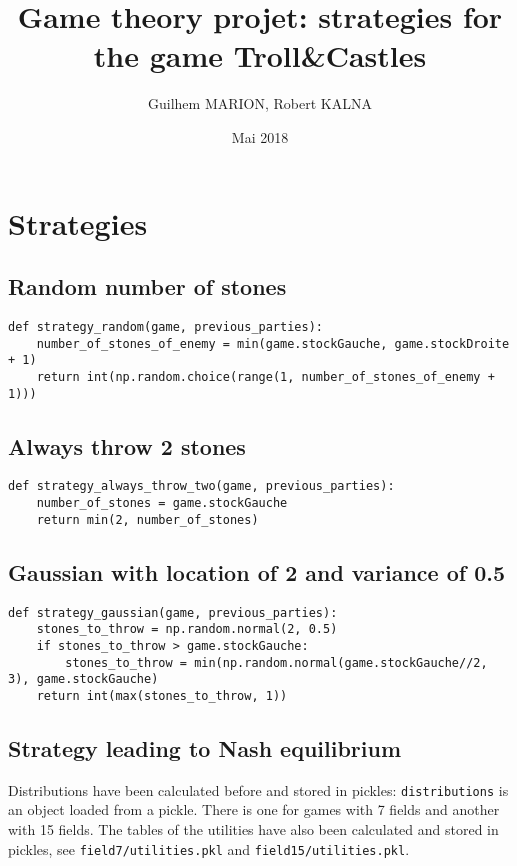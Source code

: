 \documentclass{article}%
\begin{document}
%
\author{Guilhem MARION, Robert KALNA}
\title{Game theory projet: strategies for the game Troll\&Castles}
\date{Mai 2018}
\maketitle
\normalsize%
\section{Strategies}

\subsection{Random number of stones}

\begin{verbatim}
def strategy_random(game, previous_parties):
	number_of_stones_of_enemy = min(game.stockGauche, game.stockDroite + 1)
	return int(np.random.choice(range(1, number_of_stones_of_enemy + 1)))
\end{verbatim}

\subsection{Always throw 2 stones}

\begin{verbatim}
def strategy_always_throw_two(game, previous_parties):
	number_of_stones = game.stockGauche
	return min(2, number_of_stones)
\end{verbatim}

\subsection{Gaussian with location of 2 and variance of 0.5}

\begin{verbatim}
def strategy_gaussian(game, previous_parties):
	stones_to_throw = np.random.normal(2, 0.5)
	if stones_to_throw > game.stockGauche:
		stones_to_throw = min(np.random.normal(game.stockGauche//2, 3), game.stockGauche)
	return int(max(stones_to_throw, 1))
\end{verbatim}

\subsection{Strategy leading to Nash equilibrium}

Distributions have been calculated before and stored in pickles: \texttt{distributions} is an object loaded from a pickle. There is one for games with 7 fields and another with 15 fields. The tables of the utilities have also been calculated and stored in pickles, see \texttt{field7/utilities.pkl} and \texttt{field15/utilities.pkl}.
\end{document}
